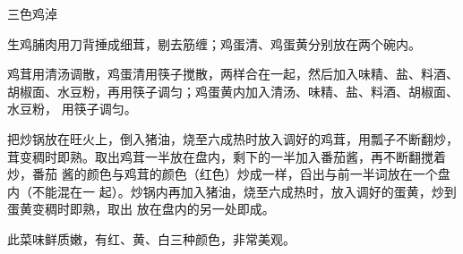 %
%
%
%
%
%
%
\begin{recipe}{三色鸡淖}

\ingredients


\preparation

\step 生鸡脯肉用刀背捶成细茸，剔去筋缠；鸡蛋清、鸡蛋黄分别放在两个碗内。

\step 鸡茸用清汤调散，鸡蛋清用筷子搅散，两样合在一起，然后加入味精、盐、料酒、
胡椒面、水豆粉，再用筷子调匀；鸡蛋黄内加入清汤、味精、盐、料酒、胡椒面、水豆粉，
用筷子调匀。

\step 把炒锅放在旺火上，倒入猪油，烧至六成热时放入调好的鸡茸，用瓢子不断翻炒，
茸变稠时即熟。取出鸡茸一半放在盘内，剩下的一半加入番茄酱，再不断翻搅着炒，番茄
酱的颜色与鸡茸的颜色（红色）炒成一样，舀出与前一半词放在一个盘内（不能混在一
起）。炒锅内再加入猪油，烧至六成热时，放入调好的蛋黄，炒到蛋黄变稠时即熟，取出
放在盘内的另一处即成。

\features

此菜味鲜质嫩，有红、黄、白三种颜色，非常美观。

\end{recipe}

